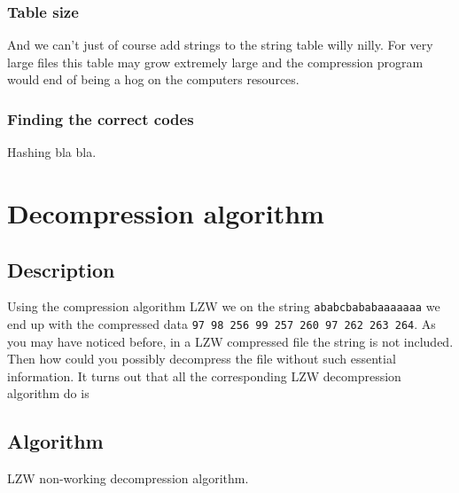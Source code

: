 \begin{refsection}
\subsubsection{Table size}

And we can't just of course add strings to the string table willy
nilly. For very large files this table may grow extremely large and
the compression program would end of being a hog on the computers
resources.

\subsubsection{Finding the correct codes}

Hashing bla bla.

\section{Decompression algorithm}

\subsection{Description}

Using the compression algorithm LZW we on the string
\texttt{ababcbababaaaaaaa} we end up with the compressed data
\texttt{97 98 256 99 257 260 97 262 263 264}. As you may have noticed
before, in a LZW compressed file the string is not included. Then how
could you possibly decompress the file without such essential
information. It turns out that all the corresponding LZW decompression
algorithm do is

\subsection{Algorithm}


\begin{algorithm}[H]
  \caption{LZW non-working decompression algorithm.}
  \label{alg:lzw-non-working-decompression}
  \begin{algorithmic}[1]
    \State {}
    \While{\neof}


      \State {}

      \State {}


\end{algorithmic}
\end{algorithm}
\end{refsection}
